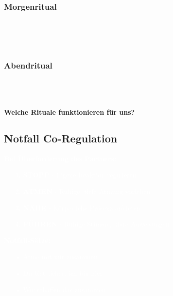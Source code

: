 \begin{ctmmOrangeBox}[title=Tägliche Verbindungsrituale]

\subsubsection{Morgenritual}
\\
\\
\\

\subsubsection{Abendritual}  
\\
\\
\\

\textbf{Welche Rituale funktionieren für uns?} \\

\end{ctmmOrangeBox}

\subsection{Notfall Co-Regulation}

\begin{ctmmRedBox}[title=\textcolor{white}{Akute Regulationshilfe}]

\textcolor{white}{\textbf{Bei Überforderung des Partners:}}

\begin{enumerate}
    \item[\textcolor{white}{1.}] \textcolor{white}{\textbf{STOPP} - Eigene Reaktion regulieren}
    \item[\textcolor{white}{2.}] \textcolor{white}{\textbf{ATMEN} - Ruhige, tiefe Atmung vorleben}
    \item[\textcolor{white}{3.}] \textcolor{white}{\textbf{NÄHE} - Körperliche Präsenz anbieten}
    \item[\textcolor{white}{4.}] \textcolor{white}{\textbf{FÜHREN} - Ruhige Stimme, klare Anweisungen}
\end{enumerate}

\textcolor{white}{\textbf{Notfall-Sätze:}}
\begin{itemize}
    \item[\textcolor{white}{•}] \textcolor{white}{\glqq Atme mit mir zusammen\grqq}
    \item[\textcolor{white}{•}] \textcolor{white}{\glqq Du bist sicher, ich bin hier\grqq}
    \item[\textcolor{white}{•}] \textcolor{white}{\glqq Wir schaffen das zusammen\grqq}
\end{itemize}

\end{ctmmRedBox}


